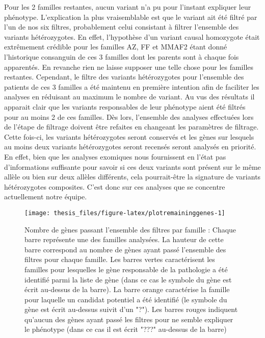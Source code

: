 \documentclass[12pt,twoside]{reedthesis}
\theoremstyle{definition}
\theoremstyle{definition}
\theoremstyle{remark}
\begin{document}
  Pour les 2 familles restantes, aucun variant n'a pu pour l'instant
  expliquer leur phénotype. L'explication la plus vraisemblable est que le
  variant ait été filtré par l'un de nos six filtres, probablement celui
  consistant à filtrer l'ensemble des variants hétérozygotes. En effet,
  l'hypothèse d'un variant causal homozygote était extrêmement crédible
  pour les familles AZ, FF et MMAF2 étant donné l'historique consanguin de
  ces 3 familles dont les parents sont à chaque fois apparentés. En
  revanche rien ne laisse supposer une telle chose pour les familles
  restantes. Cependant, le filtre des variants hétérozygotes pour
  l'ensemble des patients de ces 3 familles a été maintenu en première
  intention afin de faciliter les analyses en réduisant au maximum le
  nombre de variant. Au vus des résultats il apparait clair que les
  variants responsables de leur phénotype aient été filtrés pour au moins
  2 de ces familles. Dès lors, l'ensemble des analyses effectuées lors de
  l'étape de filtrage doivent être refaites en changeant les paramètres de
  filtrage. Cette fois-ci, les variants hétérozygotes seront conservés et
  les gènes sur lesquels au moins deux variants hétérozygotes seront
  recensés seront analysés en priorité. En effet, bien que les analyses
  exomiques nous fournissent en l'état pas d'informations suffisante pour
  savoir si ces deux variants sont présent sur le même allèle ou bien sur
  deux allèles différents, cela pourrait-être la signature de variants
  hétérozygotes composites. C'est donc sur ces analyses que se concentre
  actuellement notre équipe.
  
  \begin{figure}
  
  {\centering \texttt{[image: thesis\_files/figure-latex/plotremaininggenes-1]} 
  
  }
  
  \caption[Nombre de gènes passant l'ensemble des filtres par famille]{Nombre de gènes passant l'ensemble des filtres par famille  :  Chaque barre représente une des familles analysées. La hauteur de cette barre correspond au nombre de gènes ayant passé l'ensemble des filtres pour chaque famille. Les barres vertes caractérisent les familles pour lesquelles le gène responsable de la pathologie a été identifié parmi la liste de gène (dans ce cas le symbole du gène est écrit au-dessus de la barre). La barre orange caractérise la famille pour laquelle un candidat potentiel a été identifié (le symbole du gène est écrit au-dessus suivit d'un "?"). Les barres rouges indiquent qu'aucun des gènes ayant passé les filtres pour ne semble expliquer le phénotype (dans ce cas il est écrit "???" au-dessus de la barre)}\label{fig:plotremaininggenes}
  \end{figure}
  
\end{document}
